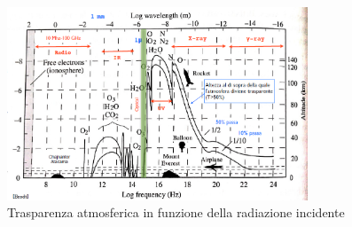 \documentclass[a4paper,twoside,openany,notitlepage]{book}
\theoremstyle{definition}
\theoremstyle{plain}
\begin{document}
\begin{figure}[h]
	\centering
	\includegraphics[width=0.8\textwidth]{./Immagini/Capitolo1/trasparenza_atm.png}
	\caption*{Trasparenza atmosferica in funzione della radiazione incidente}
\end{figure}
\end{document}
